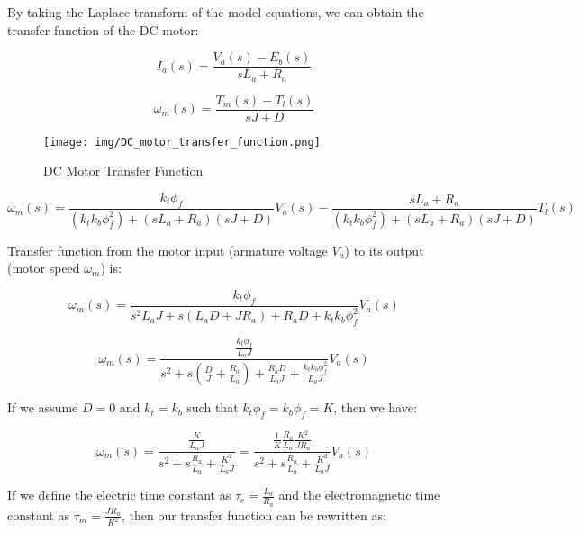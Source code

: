 \documentclass[a4paper]{article}
\begin{document}
By taking the Laplace transform of the model equations, we can obtain the transfer function of the DC motor:

$$ I_{a}(s)= \frac{ V_{a}(s) - E_{b}(s) }{ s L_{a} + R_{a} } $$

$$ \omega_{m}(s)= \frac{ T_{m}(s) - T_{l}(s) }{ s J + D }  $$


\begin{figure}
        \centering
        \texttt{[image: img/DC\_motor\_transfer\_function.png]}
        \caption{DC Motor Transfer Function \cite{kim17}}
        \label{fig:DC_motor_trns}
\end{figure}


$$  \omega_{m}(s)=  \frac{ 
                k_{t} \phi_{f} 
        }{ 
                \left( k_{t} k_{b} \phi_{f}^{2} \right) + \left( s L_{a} + R_{a} \right) \left( s J + D \right)  
        } V_{a}(s) - 
        \frac{ s L_{a} + R_{a} }{ 
                \left( k_{t} k_{b} \phi_{f}^{2} \right) + \left( s L_{a} + R_{a} \right) \left( s J + D \right)  
         } T_{l}(s)
$$

Transfer function from the motor input (armature voltage $V_{a}$) to its output (motor speed $\omega_{m}$) is:

$$  \omega_{m}(s)=  \frac{ 
                k_{t} \phi_{f} 
        }{ 
               s^{2} L_{a} J + s \left( L_{a} D + J R_{a} \right) +  R_{a} D + k_{t} k_{b} \phi_{f}^{2}
        } V_{a}(s) 
$$

$$  \omega_{m}(s)=  \frac{ 
                \frac{ k_{t} \phi_{f} }{ L_{a} J } 
        }{ 
               s^{2} + s \left( \frac{D}{J} + \frac{R_{a}}{L_{a}} \right) +  \frac{R_{a} D}{L_{a} J} +
               \frac{k_{t} k_{b} \phi_{f}^{2}}{L_{a} J}
        } V_{a}(s) 
$$

If we assume $D=0$ and $k_{t}=k_{b}$ such that $k_{t}\phi_{f}= k_{b}\phi_{f}= K$, then we have:

$$
\omega_{m}(s)= \frac{ 
                        \frac{K}{L_{a} J}
                }{
                        s^{2} + s \frac{R_{a}}{L_{a}} + \frac{K^{2}}{L_{a} J}
                }=
                \frac{
                        \frac{1}{K} \frac{R_{a}}{L_{a}} \frac{K^{2}}{J R_{a}}
                }{
                        s^{2} + s \frac{R_{a}}{L_{a}} + \frac{K^{2}}{L_{a} J}
                } V_{a}(s) 
$$

If we define the electric time constant as $\tau_{e}= \frac{L_{a}}{R_{a}}$ and the electromagnetic time constant 
as $ \tau_{m}= \frac{J R_{a}}{K^{2}} $, then our transfer function can be rewritten as:
\end{document}
